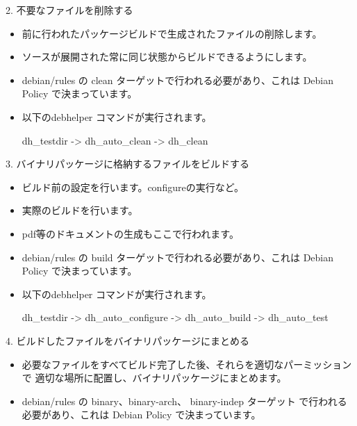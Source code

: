 \begin{frame}[containsverbatim]{2. 不要なファイルを削除する}
\begin{itemize}

\item 前に行われたパッケージビルドで生成されたファイルの削除します。
\item ソースが展開された常に同じ状態からビルドできるようにします。
\item debian/rules の clean ターゲットで行われる必要があり、これは
Debian Policy で決まっています。
\item 以下のdebhelper コマンドが実行されます。
\begin{commandline}
dh_testdir -> dh_auto_clean -> dh_clean
\end{commandline}

\end{itemize}
\end{frame}

\begin{frame}[containsverbatim]{3. バイナリパッケージに格納するファイルをビルドする}
\begin{itemize}

\item ビルド前の設定を行います。configureの実行など。
\item 実際のビルドを行います。
\item pdf等のドキュメントの生成もここで行われます。
\item debian/rules の build ターゲットで行われる必要があり、これは
Debian Policy で決まっています。
\item 以下のdebhelper コマンドが実行されます。
\begin{commandline}
dh_testdir -> dh_auto_configure -> dh_auto_build -> dh_auto_test
\end{commandline}

\end{itemize}
\end{frame}

\begin{frame}[containsverbatim]{4. ビルドしたファイルをバイナリパッケージにまとめる}
\begin{itemize}

\item 必要なファイルをすべてビルド完了した後、それらを適切なパーミッションで
適切な場所に配置し、バイナリパッケージにまとめます。

\item debian/rules の binary、binary-arch、 binary-indep ターゲット
で行われる必要があり、これは
Debian Policy で決まっています。
\end{itemize}
\end{frame}


